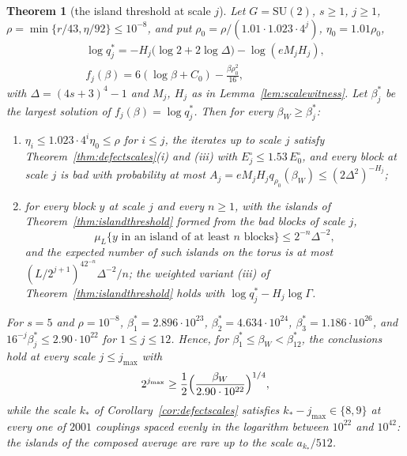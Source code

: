 \documentclass[11pt]{amsart}
\newtheorem{theorem}{Theorem}[section]
\theoremstyle{definition}
\theoremstyle{remark}
\numberwithin{equation}{section}
\newcommand{\SU}{\mathrm{SU}}
\begin{document}
\begin{theorem}[the island threshold at scale $j$]\label{thm:islandscales}
Let $G=\SU(2)$, $s\ge1$, $j\ge1$, $\rho=\min\{r/43,\eta/92\}\le10^{-8}$,
and put $\rho_0=\rho/(1.01\cdot1.023\cdot4^j)$, $\eta_0=1.01\rho_0$,
\begin{gather*}
\log q^*_j=-H_j\bigl(\log2+2\log\varDelta\bigr)-\log(eM_jH_j),\\
f_j(\beta)=6(\log\beta+C_0)-\frac{\beta\rho_0^2}{16},
\end{gather*}
with $\varDelta=(4s+3)^4-1$ and $M_j$, $H_j$ as in
Lemma~\ref{lem:scalewitness}. Let $\beta^*_j$ be the largest solution of
$f_j(\beta)=\log q^*_j$. Then for every $\beta_W\ge\beta^*_j$:
\begin{enumerate}[label=\textup{(\roman*)},leftmargin=*]
\item $\eta_i\le1.023\cdot4^i\eta_0\le\rho$ for $i\le j$, the iterates up to
scale $j$ satisfy Theorem~\ref{thm:defectscales}(i) and (iii) with
$E^\circ_j\le1.53\,E^\circ_0$, and every block at scale $j$ is bad with
probability at most $A_j=eM_jH_jq_{\rho_0}(\beta_W)\le(2\varDelta^2)^{-H_j}$;
\item for every block $y$ at scale $j$ and every $n\ge1$, with the islands
of Theorem~\ref{thm:islandthreshold} formed from the bad blocks of
scale $j$,
\[
\mu_L\{y\text{ in an island of at least }n\text{ blocks}\}\le2^{-n}
\varDelta^{-2},
\]
and the expected number of such islands on the torus is at most
$(L/2^{j+1})^42^{-n}\varDelta^{-2}/n$; the weighted variant (iii) of
Theorem~\ref{thm:islandthreshold} holds with $\log q^*_j-H_j\log\varGamma$.
\end{enumerate}
For $s=5$ and $\rho=10^{-8}$, $\beta^*_1=2.896\cdot10^{23}$,
$\beta^*_2=4.634\cdot10^{24}$, $\beta^*_3=1.186\cdot10^{26}$, and
$16^{-j}\beta^*_j\le2.90\cdot10^{22}$ for $1\le j\le12$. Hence, for
$\beta^*_1\le\beta_W<\beta^*_{12}$, the conclusions hold at every scale
$j\le j_{\max}$ with
\[
2^{j_{\max}}\ge\frac12\Bigl(\frac{\beta_W}{2.90\cdot10^{22}}\Bigr)^{1/4},
\]
while the scale $k_*$ of Corollary~\ref{cor:defectscales} satisfies
$k_*-j_{\max}\in\{8,9\}$ at every one of $2001$ couplings spaced evenly in
the logarithm between $10^{22}$ and $10^{42}$: the islands of the composed
average are rare up to the scale $a_{k_*}/512$.
\end{theorem}
\end{document}
